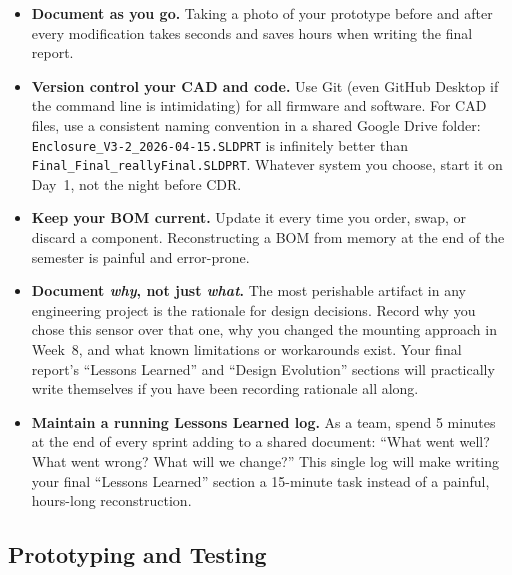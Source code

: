 \begin{itemize}[leftmargin=*, itemsep=4pt]
    \item \textbf{Document as you go.} Taking a photo of your prototype before and after every modification takes seconds and saves hours when writing the final report.
    \item \textbf{Version control your CAD and code.} Use Git (even GitHub Desktop if the command line is intimidating) for all firmware and software. For CAD files, use a consistent naming convention in a shared Google Drive folder: \texttt{Enclosure\_V3-2\_2026-04-15.SLDPRT} is infinitely better than \texttt{Final\_Final\_reallyFinal.SLDPRT}. Whatever system you choose, start it on Day~1, not the night before CDR.
    \item \textbf{Keep your BOM current.} Update it every time you order, swap, or discard a component. Reconstructing a BOM from memory at the end of the semester is painful and error-prone.
    \item \textbf{Document \textit{why}, not just \textit{what}.} The most perishable artifact in any engineering project is the rationale for design decisions. Record why you chose this sensor over that one, why you changed the mounting approach in Week~8, and what known limitations or workarounds exist. Your final report's ``Lessons Learned'' and ``Design Evolution'' sections will practically write themselves if you have been recording rationale all along.
    \item \textbf{Maintain a running Lessons Learned log.} As a team, spend 5 minutes at the end of every sprint adding to a shared document: ``What went well? What went wrong? What will we change?'' This single log will make writing your final ``Lessons Learned'' section a 15-minute task instead of a painful, hours-long reconstruction.
\end{itemize}

\subsection{Prototyping and Testing}


